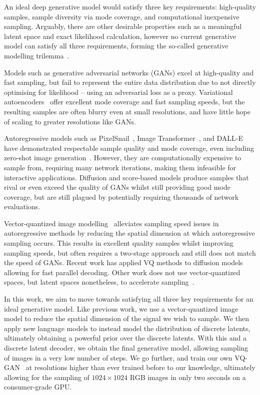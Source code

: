An ideal deep generative model would satisfy three key requirements:
high-quality samples, sample diversity via mode coverage, and computational
inexpensive sampling. Arguably, there are other desirable properties such as a
meaningful latent space and exact likelihood calculation, however no current
generative model can satisfy all three requirements, forming the so-called
generative modelling trilemma~\cite{xiao2021trilemma}. 

Models such as generative adversarial networks (GANs) excel at high-quality and
fast sampling, but fail to represent the entire data distribution due to not
directly optimising for likelihood -- using an adversarial loss as a proxy.
Variational autoencoders~\cite{kingma2013vae} offer excellent mode coverage and
fast sampling speeds, but the resulting samples are often blurry even at small
resolutions, and have little hope of scaling to greater resolutions like GANs.

Autoregressive models such as PixelSnail~\cite{chen2017snail}, Image
Transformer~\cite{parmar2018image}, and DALL-E~\cite{parmar2018image} have
demonstrated respectable sample quality and mode coverage, even including
zero-shot image generation~\cite{parmar2018image}. However, they are
computationally expensive to sample from, requiring many network iterations,
making them infeasible for interactive applications. Diffusion and score-based
models produce samples that rival or even exceed the quality of GANs whilst
still providing good mode coverage, but are still plagued by potentially
requiring thousands of network evaluations.

Vector-quantized image
modelling~\cite{oord2017vqvae,razavi2019generating,esser2021taming} alleviates
sampling speed issues in autoregressive methods by reducing the spatial
dimension at which autoregressive sampling occurs. This results in excellent
quality samples whilst improving sampling speeds, but often requires a two-stage
approach and still does not match the speed of GANs. Recent work has applied VQ
methods to diffusion models~\cite{bondtaylor2021unleashing} allowing for fast
parallel decoding. Other work does not use vector-quantized spaces, but latent
spaces nonetheless, to accelerate
sampling~\cite{xiao2021trilemma,vahdat2021sbmlatent}. 

In this work, we aim to move towards satisfying all three key requirements for
an ideal generative model. Like previous work, we use a vector-quantized image
model to reduce the spatial dimension of the signal we wish to sample. We then
apply new language models to instead model the distribution of discrete latents,
ultimately obtaining a powerful prior over the discrete latents. With this and a
discrete latent decoder, we obtain the final generative model, allowing sampling
of images in a very low number of steps. We go further, and train our own
VQ-GAN~\cite{esser2021taming} at resolutions higher than ever trained before to
our knowledge, ultimately allowing for the sampling of $1024 \times 1024$ RGB
images in only two seconds on a consumer-grade GPU.

